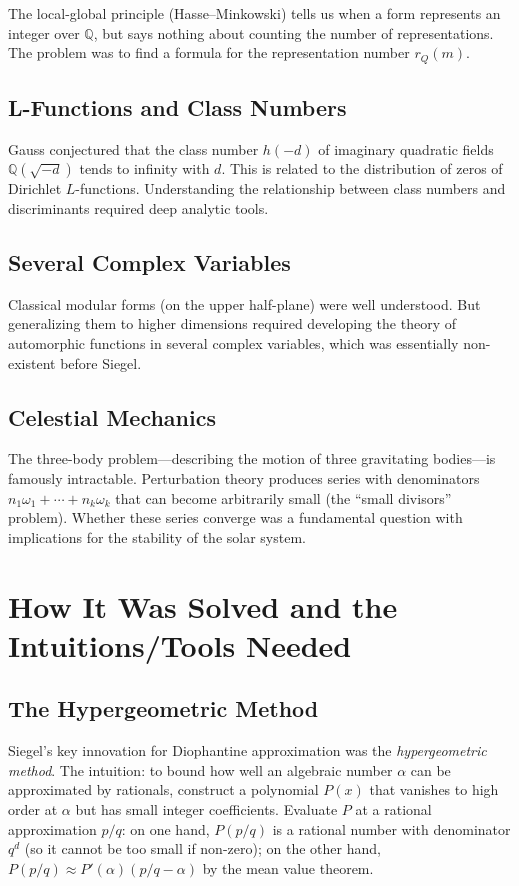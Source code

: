 The local-global principle (Hasse--Minkowski) tells us when a form represents an integer over $\mathbb{Q}$, but says nothing about counting the number of representations. The problem was to find a formula for the representation number $r_Q(m)$.

\subsection{L-Functions and Class Numbers}

Gauss conjectured that the class number $h(-d)$ of imaginary quadratic fields $\mathbb{Q}(\sqrt{-d})$ tends to infinity with $d$. This is related to the distribution of zeros of Dirichlet $L$-functions. Understanding the relationship between class numbers and discriminants required deep analytic tools.

\subsection{Several Complex Variables}

Classical modular forms (on the upper half-plane) were well understood. But generalizing them to higher dimensions required developing the theory of automorphic functions in several complex variables, which was essentially non-existent before Siegel.

\subsection{Celestial Mechanics}

The three-body problem---describing the motion of three gravitating bodies---is famously intractable. Perturbation theory produces series with denominators $n_1\omega_1 + \cdots + n_k\omega_k$ that can become arbitrarily small (the ``small divisors'' problem). Whether these series converge was a fundamental question with implications for the stability of the solar system.

\section{How It Was Solved and the Intuitions/Tools Needed}

\subsection{The Hypergeometric Method}

Siegel's key innovation for Diophantine approximation was the \textit{hypergeometric method}. The intuition: to bound how well an algebraic number $\alpha$ can be approximated by rationals, construct a polynomial $P(x)$ that vanishes to high order at $\alpha$ but has small integer coefficients. Evaluate $P$ at a rational approximation $p/q$: on one hand, $P(p/q)$ is a rational number with denominator $q^d$ (so it cannot be too small if non-zero); on the other hand, $P(p/q) \approx P'(\alpha)(p/q - \alpha)$ by the mean value theorem.


